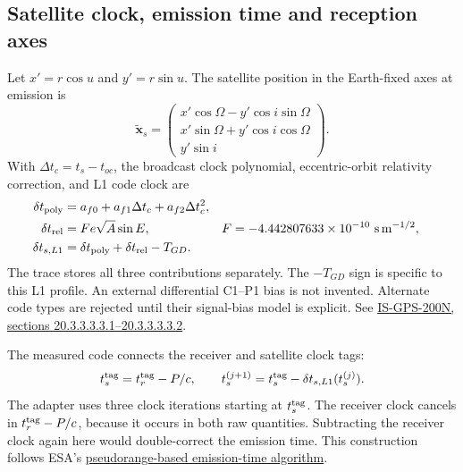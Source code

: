 \clearpage
\subsection{Satellite clock, emission time and reception axes}
\label{sec:live-clock}

Let $x'=r\cos u$ and $y'=r\sin u$. The satellite position in the Earth-fixed
axes at emission is
\begin{equation}
 \widetilde{\boldsymbol x}_s=
 \begin{pmatrix}
 x'\cos\Omega-y'\cos i\sin\Omega\\
 x'\sin\Omega+y'\cos i\cos\Omega\\
 y'\sin i
 \end{pmatrix}.
\end{equation}
With $\Delta t_c=t_s-t_{oc}$, the broadcast clock polynomial, eccentric-orbit
relativity correction, and L1 code clock are
\begin{align}
 \delta t_{\rm poly}&=a_{f0}+a_{f1}\Delta t_c+a_{f2}\Delta t_c^2,\\
 \delta t_{\rm rel}&=F e\sqrt A\sin E,
 &F&=-4.442807633\times10^{-10}\ \mathrm{s\,m^{-1/2}},\\
 \delta t_{s,L1}&=\delta t_{\rm poly}+\delta t_{\rm rel}-T_{GD}.
 \label{eq:live-l1-clock}
\end{align}
The trace stores all three contributions separately. The $-T_{GD}$ sign is
specific to this L1 profile. An external differential C1--P1 bias is not
invented. Alternate code types are rejected until their signal-bias model is
explicit. See \href{https://www.gps.gov/sites/default/files/2025-07/IS-GPS-200N.pdf}{IS-GPS-200N,
sections 20.3.3.3.3.1--20.3.3.3.3.2}.

The measured code connects the receiver and satellite clock tags:
\begin{equation}
 t_s^{\rm tag}=t_r^{\rm tag}-P/c,
 \qquad
 t_s^{(j+1)}=t_s^{\rm tag}-\delta t_{s,L1}(t_s^{(j)}).
 \label{eq:live-transmit-time}
\end{equation}
The adapter uses three clock iterations starting at $t_s^{\rm tag}$. The
receiver clock cancels in $t_r^{\rm tag}-P/c$, because it occurs in both raw
quantities. Subtracting the receiver clock again here would double-correct the
emission time. This construction follows ESA's
\href{https://gssc.esa.int/navipedia/index.php/Emission_Time_Computation}{pseudorange-based
emission-time algorithm}.


